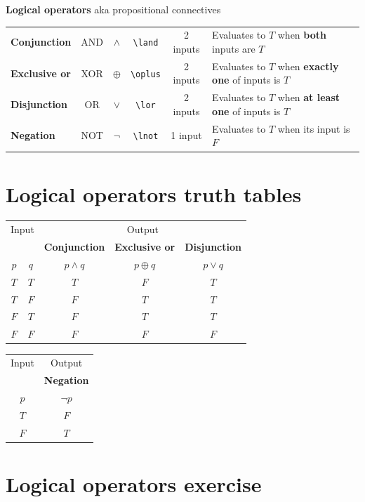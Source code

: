 \documentclass[12pt, oneside]{article}
\begin{document}
{\bf Logical operators} aka propositional connectives

\begin{tabular}{lccccp{4in}}
{\bf Conjunction} & AND & $\land$ &\verb|\land| & 2 inputs & Evaluates to $T$ when {\bf both} inputs are $T$\\
{\bf Exclusive or} & XOR & $\oplus$ &\verb|\oplus| & 2 inputs & Evaluates to $T$ when {\bf exactly one} of inputs is $T$\\
{\bf Disjunction} & OR & $\lor$ &\verb|\lor| & 2 inputs & Evaluates to $T$ when {\bf at least one} of inputs is $T$\\
{\bf Negation} & NOT & $\lnot$ &\verb|\lnot| & 1 input & Evaluates to $T$ when its input is $F$\\
\end{tabular} \vfill
\section*{Logical operators truth tables}


\begin{center}
\begin{tabular}{cc||c|c|c}
\multicolumn{2}{c||}{Input}  & \multicolumn{3}{c}{Output} \\
& & {\bf Conjunction} &  {\bf Exclusive or} & {\bf Disjunction} \\
$p$ & $q$ & $p \land q$ &  $p  \oplus  q$ & $p \lor  q$ \\
\hline
$T$ & $T$ & $T$ & $F$ & $T$\\
$T$ & $F$ & $F$ & $T$ & $T$\\
$F$ & $T$ & $F$ & $T$ & $T$\\
$F$ & $F$ & $F$ & $F$ & $F$\\
\end{tabular}
\qquad \qquad\qquad
\begin{tabular}{c||c}
Input & Output \\
& {\bf Negation} \\
$p$ & $\lnot p$ \\
\hline
$T$ & $F$ \\
$F$ & $T$\\
\end{tabular}
\end{center}

\vfill \vfill
\section*{Logical operators exercise}
\end{document}
